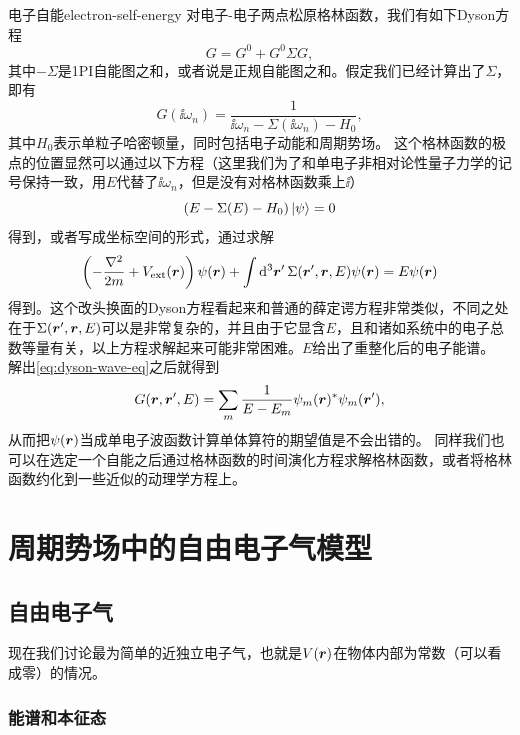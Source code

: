 \begin{back}{电子自能}{electron-self-energy}
    对电子-电子两点松原格林函数，我们有如下Dyson方程
    \begin{equation}
        G  = G^{0} + G^0 \Sigma G,
    \end{equation}
    其中$-\Sigma$是1PI自能图之和，或者说是正规自能图之和。假定我们已经计算出了$\Sigma$，即有
    \[
        G(\ii \omega_n) = \frac{1}{\ii \omega_n - \Sigma(\ii \omega_n) - H_0},
    \]
    其中$H_0$表示单粒子哈密顿量，同时包括电子动能和周期势场。
    这个格林函数的极点的位置显然可以通过以下方程（这里我们为了和单电子非相对论性量子力学的记号保持一致，用$E$代替了$\ii \omega_n$，但是没有对格林函数乘上$\ii$）
    \[
        (E - \Sigma(E) - H_0) \ket{\psi} = 0 
    \]
    得到，或者写成坐标空间的形式，通过求解
    \begin{equation}
        \left( - \frac{\laplacian}{2m} + V_\text{ext}(\vb*{r}) \right) \psi(\vb*{r}) + \int \dd[3]{\vb*{r}'} \Sigma(\vb*{r}', \vb*{r}, E) \psi(\vb*{r}) = E \psi(\vb*{r})
        \label{eq:dyson-wave-eq}
    \end{equation}
    得到。这个改头换面的Dyson方程看起来和普通的薛定谔方程非常类似，不同之处在于$\Sigma(\vb*{r}', \vb*{r}, E)$可以是非常复杂的，并且由于它显含$E$，且和诸如系统中的电子总数等量有关，以上方程求解起来可能非常困难。$E$给出了重整化后的电子能谱。
    解出\eqref{eq:dyson-wave-eq}之后就得到
    \begin{equation}
        G(\vb*{r}, \vb*{r}', E) = \sum_m \frac{1}{E - E_m} \psi_m(\vb*{r})^* \psi_m(\vb*{r}'),
    \end{equation}
    从而把$\psi(\vb*{r})$当成单电子波函数计算单体算符的期望值是不会出错的。
    同样我们也可以在选定一个自能之后通过格林函数的时间演化方程求解格林函数，或者将格林函数约化到一些近似的动理学方程上。
\end{back}

\section{周期势场中的自由电子气模型}

\subsection{自由电子气}

现在我们讨论最为简单的近独立电子气，也就是$V(\vb*{r})$在物体内部为常数（可以看成零）的情况。

\subsubsection{能谱和本征态} 

